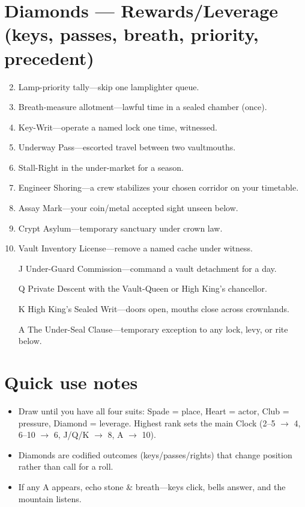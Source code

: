 \section*{Diamonds --- Rewards/Leverage (keys, passes, breath, priority, precedent)}
\label{sec:aeler-rewards}
\begin{enumerate}
\setcounter{enumi}{1}
\item Lamp-priority tally---skip one lamplighter queue.
\item Breath-measure allotment---lawful time in a sealed chamber (once).
\item Key-Writ---operate a named lock one time, witnessed.
\item Underway Pass---escorted travel between two vaultmouths.
\item Stall-Right in the under-market for a season.
\item Engineer Shoring---a crew stabilizes your chosen corridor on your timetable.
\item Assay Mark---your coin/metal accepted sight unseen below.
\item Crypt Asylum---temporary sanctuary under crown law.
\item Vault Inventory License---remove a named cache under witness.
\item[J] Under-Guard Commission---command a vault detachment for a day.
\item[Q] Private Descent with the Vault-Queen or High King's chancellor.
\item[K] High King's Sealed Writ---doors open, mouths close across crownlands.
\item[A] The Under-Seal Clause---temporary exception to any lock, levy, or rite below.
\end{enumerate}

\section*{Quick use notes}
\label{sec:aeler-quick-use}
\begin{itemize}
\item Draw until you have all four suits: Spade = place, Heart = actor, Club = pressure, Diamond = leverage. Highest rank sets the main Clock (2--5 $\rightarrow$ 4, 6--10 $\rightarrow$ 6, J/Q/K $\rightarrow$ 8, A $\rightarrow$ 10).
\item Diamonds are codified outcomes (keys/passes/rights) that change position rather than call for a roll.
\item If any A appears, echo stone \& breath---keys click, bells answer, and the mountain listens.
\end{itemize}

